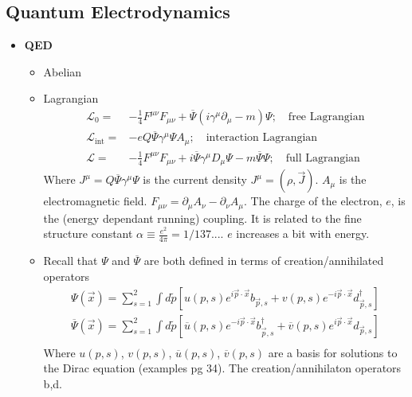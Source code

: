 \subsection{Quantum Electrodynamics}
\begin{itemize}
        \item \textbf{QED} \cite{wells}
        \begin{itemize}
            \item Abelian \cite{wells}
            \item Lagrangian \cite{wells}
            \begin{equation}\begin{split}
            \mathcal{L}_\text{0}=&-\frac{1}{4}F^{\mu\nu}F_{\mu\nu}+\overline{\Psi}(i\gamma^\mu\partial_\mu-m)\Psi; \quad\text{free Lagrangian} \\
            \mathcal{L}_\text{int}=&-eQ\overline{\Psi}\gamma^\mu\Psi A_\mu; \quad\text{interaction Lagrangian} \\
            \mathcal{L}=&-\frac{1}{4}F^{\mu\nu}F_{\mu\nu}+i\overline{\Psi}\gamma^\mu D_\mu\Psi-m\overline{\Psi}\Psi; \quad\text{full Lagrangian}
            \end{split}\end{equation}
            Where $J^\mu=Q\overline{\Psi}\gamma^\mu\Psi$ is the current density $J^\mu=(\rho,\vec{J})$. $A_\mu$ is the electromagnetic field. $F_{\mu\nu}=\partial_\mu A_\nu-\partial_\nu A_\mu$. The charge of the electron, $e$, is the (energy dependant running) coupling. It is related to the fine structure constant $\alpha\equiv\frac{e^2}{4\pi}=1/137...$. $e$ increases a bit with energy.
            \item Recall that $\Psi$ and $\overline{\Psi}$ are both defined in terms of creation/annihilated operators \cite{wells}
            \begin{equation}\begin{split}
            \Psi(\vec{x})=\sum_{s=1}^2\int d\tilde{p}[u(p,s)e^{i\vec{p}\cdot\vec{x}}b_{\vec{p},s}+v(p,s)e^{-i\vec{p}\cdot\vec{x}}d^\dagger_{\vec{p},s}] \\
            \overline{\Psi}(\vec{x})=\sum_{s=1}^2\int d\tilde{p}[\overline{u}(p,s)e^{-i\vec{p}\cdot\vec{x}}b^\dagger_{\vec{p},s}+\overline{v}(p,s)e^{i\vec{p}\cdot\vec{x}}d_{\vec{p},s}] \\
            \end{split}\end{equation}
            Where $u(p,s)$, $v(p,s)$, $\overline{u}(p,s)$, $\overline{v}(p,s)$ are a basis for solutions to the Dirac equation (examples pg 34). The creation/annihilaton operators b,d.

\end{itemize}
\end{itemize}
